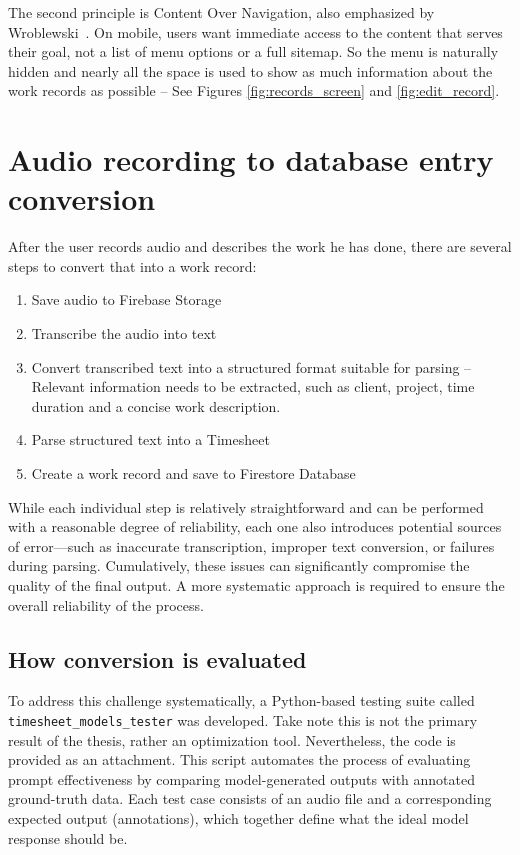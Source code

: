 \documentclass[
  digital,     %
  oneside,     %
  nosansbold,  %
  nocolorbold, %
  lof,         %
  lot,         %
]{fithesis4}
\begin{document}
The second principle is Content Over Navigation, also emphasized by Wroblewski~\cite[p.~52]{wroblewski2011mobile}. On mobile, users want immediate access to the content that serves their goal, not a list of menu options or a full sitemap. So the menu is naturally hidden and nearly all the space is used to show as much information about the work records as possible -- See Figures \ref{fig:records_screen} and \ref{fig:edit_record}.

\section{Audio recording to database entry conversion}

After the user records audio and describes the work he has done, there are several steps to convert that into a work record:
\begin{enumerate}
  \item Save audio to Firebase Storage
  \item Transcribe the audio into text
  \item Convert transcribed text into a structured format suitable for parsing -- Relevant information needs to be extracted, such as client, project, time duration and a concise work description.
  \item Parse structured text into a Timesheet
  \item Create a work record and save to Firestore Database
\end{enumerate}

While each individual step is relatively straightforward and can be performed with a reasonable degree of reliability, each one also introduces potential sources of error—such as inaccurate transcription, improper text conversion, or failures during parsing. Cumulatively, these issues can significantly compromise the quality of the final output. A more systematic approach is required to ensure the overall reliability of the process.

\subsection{How conversion is evaluated}

To address this challenge systematically, a Python-based testing suite called \texttt{timesheet\_models\_tester} was developed. Take note this is not the primary result of the thesis, rather an optimization tool. Nevertheless, the code is provided as an attachment. This script automates the process of evaluating prompt effectiveness by comparing model-generated outputs with annotated ground-truth data. Each test case consists of an audio file and a corresponding expected output (annotations), which together define what the ideal model response should be.
\end{document}
